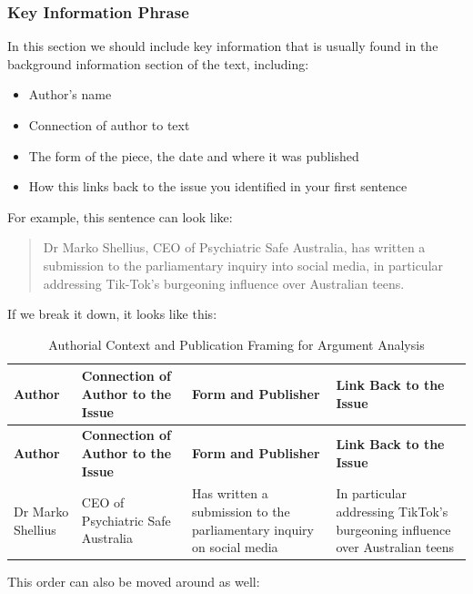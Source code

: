 \documentclass[a4paper]{article}
\begin{document}
\subsubsection{Key Information Phrase}
In this section we should include key information that is usually found in the background information section of the text, including:
\begin{itemize}
    \item Author's name
    \item Connection of author to text
    \item The form of the piece, the date and where it was published
    \item How this links back to the issue you identified in your first sentence
\end{itemize}


For example, this sentence can look like:
\begin{quote}
    Dr Marko Shellius, CEO of Psychiatric Safe Australia, has written a submission to the parliamentary inquiry into social media, in particular addressing Tik-Tok’s burgeoning influence over Australian teens. 
\end{quote}

If we break it down, it looks like this:
\begin{longtable}{|p{2cm}|p{2.5cm}|p{2cm}|p{2.5cm}|}
\caption{Authorial Context and Publication Framing for Argument Analysis} \label{tab:authorcontext} \\
\hline
\textbf{Author} & \textbf{Connection of Author to the Issue} & \textbf{Form and Publisher} & \textbf{Link Back to the Issue} \\
\hline
\endfirsthead

\hline
\textbf{Author} & \textbf{Connection of Author to the Issue} & \textbf{Form and Publisher} & \textbf{Link Back to the Issue} \\
\hline
\endhead

\hline
\endfoot

Dr Marko Shellius & CEO of Psychiatric Safe Australia & Has written a submission to the parliamentary inquiry on social media & In particular addressing TikTok’s burgeoning influence over Australian teens \\
\hline

\end{longtable}


This order can also be moved around as well:
\end{document}
